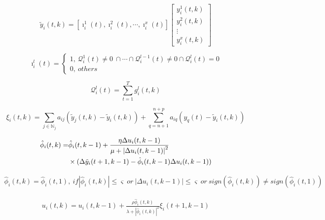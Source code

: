 \documentclass[journal,onecolumn]{IEEEtran}
\begin{document}
\begin{equation}
\label{model 5}
\tilde{y}_i(t,k)=\left[\imath_i^1(t),\imath_i^2(t),\cdots,\imath_i^x(t)\right]\begin{bmatrix}
y_i^1(t,k)\\
y_i^2(t,k)\\
\vdots\\
y_i^x(t,k)
\end{bmatrix}
\end{equation}

\begin{equation}
\label{model 6}
\imath_i^l(t)=\begin{cases}
1,\ \mathcal{Q}_i^1(t)\ne0\ \cap\cdots\cap\mathcal{Q}_i^{l-1}(t)\ne 0\cap\mathcal{Q}_i^{l}(t)=0\\
0,\ others
\end{cases}
\end{equation}

\begin{equation}
\label{model 7}
\mathcal{Q}_i^l(t)=\sum_{t=1}^{T}g_i^l(t,k)
\end{equation}

\begin{equation}
\label{model 8}
\xi_i(t,k)= {\textstyle \sum_{j\in\mathbb{N}_j}}a_{ij}(\tilde{y}_j(t,k)-\tilde{y}_i(t,k))+\sum_{q=n+1}^{n+p} a_{iq}(y_q(t)-\tilde{y}_i(t,k))
\end{equation}

\begin{align}
\label{model 9}
\hat\phi_i(t,k)=&\hat\phi_i(t,k-1)+\frac{\eta\Delta u_i(t,k-1)}{\mu+\left|\Delta u_i(t,k-1)\right|^2}
\notag \\& \times (\Delta \tilde{y}_i(t+1,k-1)-\hat\phi_i(t,k-1)\Delta u_i(t,k-1))
\end{align}

\begin{align}
\label{model 10}
\hat\phi_i(t,k)=\hat\phi_i(t,1),\ if\left|\hat\phi_i(t,k)\right|\le\varsigma \ or\ \left|\Delta u_i(t,k-1)\right|\le \varsigma \ or\
sign(\hat\phi_i(t,k))\ne sign(\hat\phi_i(t,1))
\end{align}

\begin{align}
\label{model 11}
u_i(t,k)=u_i(t,k-1)+\frac{\rho\hat\phi_i(t,k)}{\lambda+\left|\hat\phi_i(t,k)\right|^2}\xi_i(t+1,k-1)
\end{align}
\end{document}

